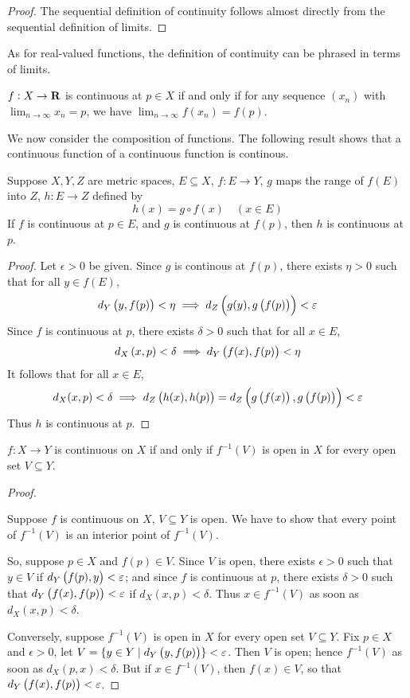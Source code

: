 \begin{proof}
The sequential definition of continuity follows almost directly from the sequential definition of limits.
\end{proof}

As for real-valued functions, the definition of continuity can be phrased in terms of limits.

\begin{corollary}
$f:X\to\mathbf R$ is continuous at $p\in X$ if and only if for any sequence $(x_n)$ with $\displaystyle\lim_{n\to\infty}x_n=p$, we have $\displaystyle\lim_{n\to\infty}f(x_n)=f(p)$.
\end{corollary}

We now consider the composition of functions. The following result shows that a continuous function of a continuous function is continous.

\begin{proposition}
Suppose $X,Y,Z$ are metric spaces, $E\subseteq X$, $f:E\to Y$, $g$ maps the range of $f(E)$ into $Z$, $h:E\to Z$ defined by
\[h(x)=g\circ f(x)\quad(x\in E)\]
If $f$ is continuous at $p\in E$, and $g$ is continuous at $f(p)$, then $h$ is continuous at $p$.
\end{proposition}

\begin{proof}
Let $\epsilon>0$ be given. Since $g$ is continous at $f(p)$, there exists $\eta>0$ such that for all $y\in f(E)$,
\[d_Y\left(y,f(p)\right)<\eta\implies d_Z\left(g(y),g\left(f(p)\right)\right)<\varepsilon\]
Since $f$ is continuous at $p$, there exists $\delta>0$ such that for all $x\in E$,
\[d_X\left(x,p\right)<\delta\implies d_Y\left(f(x),f(p)\right)<\eta\]
It follows that for all $x\in E$,
\[d_X(x,p)<\delta\implies d_Z\left(h(x),h(p)\right)=d_Z\left(g\left(f(x)\right),g\left(f(p)\right)\right)<\varepsilon\]
Thus $h$ is continuous at $p$. 
\end{proof}

\begin{proposition}
$f:X\to Y$ is continuous on $X$ if and only if $f^{-1}(V)$ is open in $X$ for every open set $V\subseteq Y$.
\end{proposition}

\begin{proof} \

\fbox{$\implies$} Suppose $f$ is continuous on $X$, $V\subseteq Y$ is open. We have to show that every point of $f^{-1}(V)$ is an interior point of $f^{-1}(V)$.

So, suppose $p\in X$ and $f(p)\in V$. Since $V$ is open, there exists $\epsilon>0$ such that $y\in V$ if $d_Y\left(f(p),y\right)<\varepsilon$; and since $f$ is continuous at $p$, there exists $\delta>0$ such that $d_Y\left(f(x),f(p)\right)<\varepsilon$ if $d_X(x,p)<\delta$. Thus $x\in f^{-1}(V)$ as soon as $d_X(x,p)<\delta$.

\fbox{$\impliedby$} Conversely, suppose $f^{-1}(V)$ is open in $X$ for every open set $V\subseteq Y$. Fix $p\in X$ and $\epsilon>0$, let $V=\{y\in Y\mid d_Y\left(y,f(p)\right)\}<\varepsilon$. Then $V$ is open; hence $f^{-1}(V)$ as soon as $d_X(p,x)<\delta$. But if $x\in f^{-1}(V)$, then $f(x)\in V$, so that $d_Y\left(f(x),f(p)\right)<\varepsilon$.
\end{proof}

